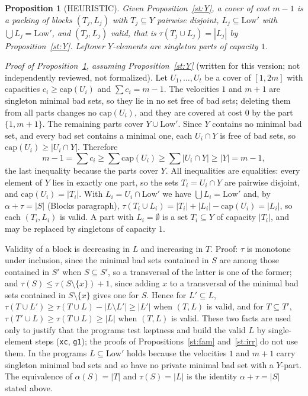 \documentclass[11pt]{article}
\newtheorem{proposition}[theorem]{Proposition}
\theoremstyle{remark}
\begin{document}
\begin{proposition}[HEURISTIC]\label{st:pack}
Given Proposition~\ref{st:Y}, a cover of cost $m-1$ is a packing of \emph{blocks} $(T_j,L_j)$ with $T_j\subseteq Y$ pairwise disjoint, $L_j\subseteq\mathrm{Low}'$ with $\bigcup L_j=\mathrm{Low}'$, and $(T_j,L_j)$ valid, that is $\tau(T_j\cup L_j)=|L_j|$ by Proposition~\ref{st:Y}. Leftover $Y$-elements are singleton parts of capacity $1$.
\end{proposition}
\noindent\emph{Proof of Proposition~\ref{st:pack}, assuming Proposition~\ref{st:Y}} (written for this version; not independently reviewed, not formalized). Let $U_1,\dots,U_t$ be a cover of $[1,2m]$ with capacities $c_i\ge\mathrm{cap}(U_i)$ and $\sum c_i=m-1$. The velocities $1$ and $m+1$ are singleton minimal bad sets, so they lie in no set free of bad sets; deleting them from all parts changes no $\mathrm{cap}(U_i)$, and they are covered at cost $0$ by the part $\{1,m+1\}$. The remaining parts cover $Y\cup\mathrm{Low}'$. Since $Y$ contains no minimal bad set, and every bad set contains a minimal one, each $U_i\cap Y$ is free of bad sets, so $\mathrm{cap}(U_i)\ge|U_i\cap Y|$. Therefore
\[
m-1=\sum c_i\ge\sum\mathrm{cap}(U_i)\ge\sum|U_i\cap Y|\ge|Y|=m-1,
\]
the last inequality because the parts cover $Y$. All inequalities are equalities: every element of $Y$ lies in exactly one part, so the sets $T_i=U_i\cap Y$ are pairwise disjoint, and $\mathrm{cap}(U_i)=|T_i|$. With $L_i=U_i\cap\mathrm{Low}'$ we have $\bigcup L_i=\mathrm{Low}'$ and, by $\alpha+\tau=|S|$ (Blocks paragraph), $\tau(T_i\cup L_i)=|T_i|+|L_i|-\mathrm{cap}(U_i)=|L_i|$, so each $(T_i,L_i)$ is valid. A part with $L_i=\emptyset$ is a set $T_i\subseteq Y$ of capacity $|T_i|$, and may be replaced by singletons of capacity $1$.

\noindent Validity of a block is decreasing in $L$ and increasing in $T$. Proof: $\tau$ is monotone under inclusion, since the minimal bad sets contained in $S$ are among those contained in $S'$ when $S\subseteq S'$, so a transversal of the latter is one of the former; and $\tau(S)\le\tau(S\setminus\{x\})+1$, since adding $x$ to a transversal of the minimal bad sets contained in $S\setminus\{x\}$ gives one for $S$. Hence for $L'\subseteq L$, $\tau(T\cup L')\ge\tau(T\cup L)-|L\setminus L'|\ge|L'|$ when $(T,L)$ is valid, and for $T\subseteq T'$, $\tau(T'\cup L)\ge\tau(T\cup L)\ge|L|$ when $(T,L)$ is valid. These two facts are used only to justify that the programs test keptness and build the valid $L$ by single-element steps (\texttt{xc}, \texttt{g1}); the proofs of Propositions~\ref{st:fam} and~\ref{st:irr} do not use them. In the programs $L\subseteq\mathrm{Low}'$ holds because the velocities $1$ and $m+1$ carry singleton minimal bad sets and so have no private minimal bad set with a $Y$-part. The equivalence of $\alpha(S)=|T|$ and $\tau(S)=|L|$ is the identity $\alpha+\tau=|S|$ stated above.
\end{document}
